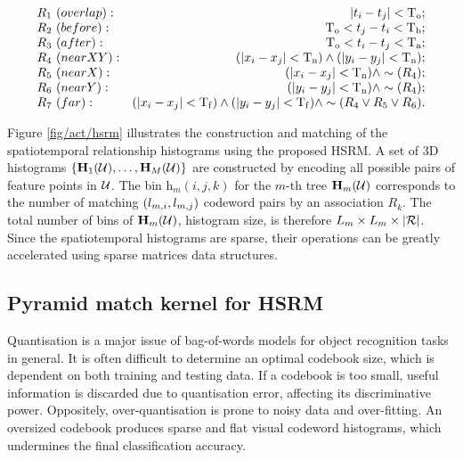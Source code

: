 \begin{equation}
	\centering 
	\begin{array}{lr}
		R_{1}~{(overlap)}: & |t_i - t_j| < \mathrm{T_{o}}; \\
		R_{2}~{(before)}: & \mathrm{T_{o}} < t_j - t_i < \mathrm{T_{b}}; \\
		R_{3}~{(after)}: & \mathrm{T_{o}} < t_i - t_j < \mathrm{T_{a}}; \\
		R_{4}~{(near XY)}: & (|x_i - x_j| < \mathrm{T_{n}}) \wedge (|y_i - y_j| < \mathrm{T_{n}}); \\
		R_{5}~{(near X)}: & (|x_i - x_j| < \mathrm{T_{n}}) \wedge \sim(R_{4}); \\
		R_{6}~{(near Y)}: & (|y_i - y_j| < \mathrm{T_{n}}) \wedge \sim(R_{4}); \\
		R_{7}~{(far)}: & (|x_i - x_j| < \mathrm{T_{f}}) \wedge (|y_i - y_j| < \mathrm{T_{f}}) \wedge \sim(R_{4} \vee R_{5} \vee R_{6}).
	\end{array}
\end{equation}

Figure \ref{fig/act/hsrm} illustrates the construction and matching of the spatiotemporal relationship histograms using the proposed HSRM. 
A set of 3D histograms $\{ \mathbf{H}_1(\mathcal{U}),\dots,\mathbf{H}_{M}(\mathcal{U})\}$ are constructed by encoding all possible pairs of feature points in $\mathcal{U}$. The bin $\mathrm{h}_{m}(i,j,k)$ for the $m$-th tree $\mathbf{H}_{m}(\mathcal{U})$ corresponds to the number of matching $(l_{m,i},l_{m,j})$ codeword pairs by an association $R_k$. The total number of bins of $\mathbf{H}_m(\mathcal{U})$, \ie histogram size, is therefore $L_m \times L_m \times |\mathcal{R}|$. Since the spatiotemporal histograms are sparse, their operations can be greatly accelerated using sparse matrices data structures.  

\subsection{Pyramid match kernel for HSRM}
Quantisation is a major issue of bag-of-words models for object recognition tasks in general. It is often difficult to determine an optimal codebook size, which is dependent on both training and testing data. 
If a codebook is too small, useful information is discarded due to quantisation error, affecting its discriminative power. 
Oppositely, over-quantisation is prone to noisy data and over-fitting. An oversized codebook produces sparse and flat visual codeword histograms, which undermines the final classification accuracy.  

